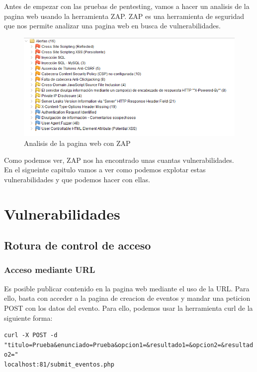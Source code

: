 \documentclass{report}
\begin{document}
        Antes de empezar con las pruebas de pentesting, vamos a hacer un analisis de la pagina web usando la herramienta ZAP.
        ZAP es una herramienta de seguridad que nos permite analizar una pagina web en busca de vulnerabilidades.\\
        \begin{figure}[H]
            \centering
            \includegraphics[width=1\textwidth]{./img/introduccion/1.png}
            \caption{Analisis de la pagina web con ZAP}
        \end{figure}
        Como podemos ver, ZAP nos ha encontrado unas cuantas vulnerabilidades.\\
        En el sigueinte capitulo vamos a ver como podemos explotar estas vulnerabilidades y que podemos hacer con ellas.
    \chapter{Vulnerabilidades}
        \section{Rotura de control de acceso}
            \subsection{Acceso mediante URL}
                Es posible publicar contenido en la pagina web mediante el uso de la URL.
                Para ello, basta con acceder a la pagina de creacion de eventos y mandar una peticion POST con los datos del evento.
                Para ello, podemos usar la herramienta curl de la siguiente forma:\\

                \begin{center}
                    \texttt{curl -X POST -d "titulo=Prueba\&enunciado=Prueba\&opcion1=\&resultado1=\&opcion2=\&resultado2="\\localhost:81/submit\_eventos.php}
                \end{center}
\end{document}
